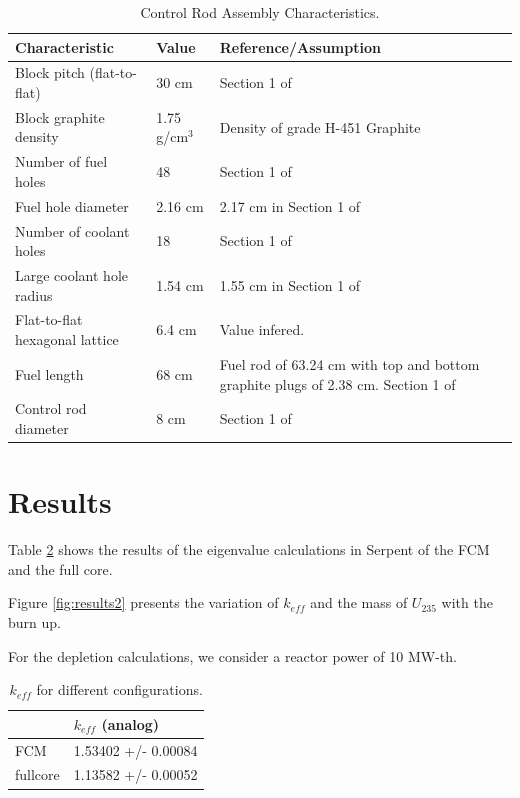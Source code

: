 \documentclass[11pt,letterpaper]{article}
\begin{document}
	\begin{table}[htbp!]
		\centering
	    \caption{Control Rod Assembly Characteristics.}
	    \label{tab:control}
		\begin{tabular}{l|l|l}
		\hline
		Characteristic                   & Value         & Reference/Assumption \\ \hline
		Block pitch (flat-to-flat)       & 30 cm         & Section 1 of \cite{hawari_development_2018} \\
		Block graphite density           & 1.75 g/cm$^3$ & Density of grade H-451 Graphite \cite{gougar_prismatic_2010} \\
		Number of fuel holes             & 48            & Section 1 of \cite{hawari_development_2018} \\
		Fuel hole diameter               & 2.16 cm       & 2.17 cm in Section 1 of \cite{hawari_development_2018} \\
		Number of coolant holes          & 18            & Section 1 of \cite{hawari_development_2018} \\
		Large coolant hole radius        & 1.54 cm       & 1.55 cm in Section 1 of \cite{hawari_development_2018} \\
		Flat-to-flat hexagonal lattice   & 6.4 cm        & Value infered. \\
		Fuel length                      & 68 cm         & Fuel rod of 63.24 cm with top and bottom graphite plugs of 2.38 cm. Section 1 of \cite{hawari_development_2018} \\ 
		Control rod diameter             & 8 cm          & Section 1 of \cite{hawari_development_2018} \\ \hline
		\end{tabular}
	\end{table}

\section{Results}

Table \ref{tab:results1} shows the results of the eigenvalue calculations in Serpent of the FCM and the full core.

Figure \ref{fig:results2} presents the variation of $k_{eff}$ and the mass of $U_{235}$ with the burn up.

For the depletion calculations, we consider a reactor power of 10 MW-th.

	\begin{table}[htbp!]
		\centering
	    \caption{$k_{eff}$ for different configurations.}
	    \label{tab:results1}
		\begin{tabular}{l|l}
		\hline
		             & $k_{eff}$ (analog)  \\ \hline
		FCM          & 1.53402 +/- 0.00084 \\ 
		fullcore     & 1.13582 +/- 0.00052 \\ \hline

		\end{tabular}
	\end{table}
\end{document}
